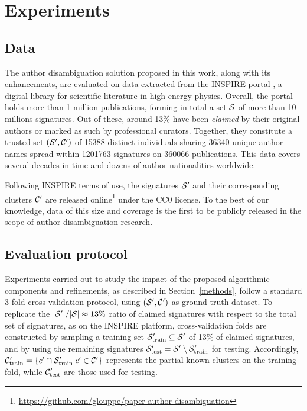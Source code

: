 \documentclass{article}
\begin{document}

\section{Experiments}
\label{experiments}

\subsection{Data}

The author disambiguation solution proposed in this work, along with its
enhancements, are evaluated on data extracted from the INSPIRE portal
\citep{gentil2009information}, a digital library for scientific literature in
high-energy physics. Overall, the portal holds more than 1 million
publications, forming in total a set ${\cal S}$ of more than 10 millions
signatures. Out of these, around 13\% have been \textit{claimed} by their
original authors or marked as such by professional curators. Together, they
constitute a trusted set $({\cal S}^\prime, {\cal C}^\prime)$ of 15388 distinct individuals sharing
36340 unique author names spread within 1201763 signatures on 360066
publications. This data covers several decades in time and dozens of author
nationalities worldwide.

Following INSPIRE terms of use, the signatures ${\cal S}^\prime$ and their
corresponding clusters ${\cal C}^\prime$ are released
online\footnote{\url{https://github.com/glouppe/paper-author-disambiguation}}
under the CC0 license. To the best of our knowledge, data of this size and
coverage is the first to be publicly released in the scope of author
disambiguation research.

\subsection{Evaluation protocol}

Experiments carried out to study the impact of the proposed algorithmic
components and refinements, as described in Section~\ref{methods}, follow a
standard 3-fold cross-validation protocol, using $({\cal S}^\prime, {\cal C}^\prime)$ as
ground-truth dataset. To replicate the $|{\cal S}^\prime| / |{\cal S}| \approx 13\%$ ratio
of claimed signatures with respect to the total set of signatures, as on the
INSPIRE platform, cross-validation folds are constructed by sampling a training
set ${\cal S}_\text{train}^\prime \subseteq {\cal S}^\prime$ of 13\% of claimed
signatures, and by using the remaining signatures ${\cal S}_\text{test}^\prime = {\cal S}^\prime \setminus {\cal S}_\text{train}^\prime$ for testing. Accordingly, ${\cal
C}_\text{train}^\prime = \{ c^\prime \cap {\cal S}_\text{train}^\prime |
c^\prime \in {\cal C}^\prime \}$ represents the partial known
clusters on the training fold, while ${\cal C}_\text{test}^\prime$ are those
used for testing.
\end{document}
